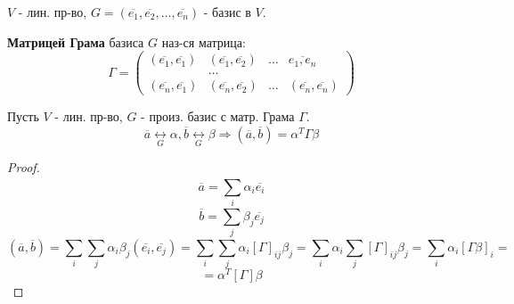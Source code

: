 $V$ - лин. пр-во, $G = (\overline{e_1}, \overline{e_2}, \ldots , \overline{e_n})$ - базис в $V$.
\begin{definition}
\textbf{Матрицей Грама} базиса $G$ наз-ся матрица:
\[
  \Gamma = \begin{pmatrix}(\overline{e_1}, \overline{e_1}) & (\overline{e_1}, \overline{e_2}) & \ldots & \overline{e_1, e_n} \\ & \ldots & \\ (\overline{e_n}, \overline{e_1}) & (\overline{e_n}, \overline{e_2}) & \ldots & (\overline{e_n}, \overline{e_n}) \end{pmatrix}
\] 
\end{definition}
\begin{theorem}
Пусть $V$ - лин. пр-во, $G$ - произ. базис с матр. Грама $\Gamma$.
\[
\overline{a} \underset{G}{\longleftrightarrow}\alpha, \overline{b}\underset{G}{\longleftrightarrow}\beta \Rightarrow (\overline{a}, \overline{b}) = \alpha^{T} \Gamma \beta 
\] 
\end{theorem}
\begin{proof}
\[
\overline{a} = \sum_{i}^{} \alpha_i \overline{e_i}
\] 
\[
\overline{b} = \sum_{j}^{} \beta_j \overline{e_j}
\] 
\[
  (\overline{a}, \overline{b}) = \sum_{i}^{} \sum_{j}^{} \alpha_i \beta_j(\overline{e_i}, \overline{e_j}) = \sum_{i}^{} \sum_{j}^{} \alpha_i [\Gamma]_{ij} \beta_j = \sum_{i}^{} \alpha_i \sum_{j}^{} [\Gamma]_{ij} \beta_j = \sum_{i}^{} \alpha_i [\Gamma \beta]_i = 
\] 
\[
 = \alpha^{T} [\Gamma] \beta
\] 
\end{proof}

